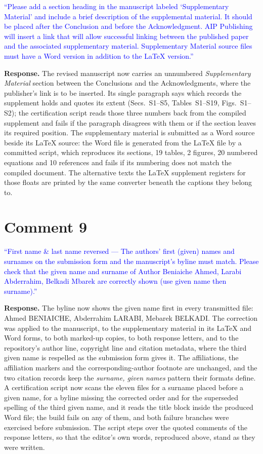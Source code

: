 \documentclass[11pt,a4paper]{article}
\begin{document}
\noindent\textcolor{blue}{``Please add a section heading in the manuscript
labeled `Supplementary Material' and include a brief description of the
supplemental material. It should be placed after the Conclusion and before the
Acknowledgment. AIP Publishing will insert a link that will allow successful
linking between the published paper and the associated supplementary material.
Supplementary Material source files must have a Word version in addition to the
\LaTeX{} version.''}

\textbf{Response.} The revised manuscript now carries an unnumbered
\textit{Supplementary Material} section between the Conclusions and the
Acknowledgments, where the publisher's link is to be inserted. Its single
paragraph says which records the supplement holds and quotes its extent
(Secs.~S1--S5, Tables~S1--S19, Figs.~S1--S2); the certification script reads those
three numbers back from the compiled supplement and fails if the paragraph
disagrees with them or if the section leaves its required position. The
supplementary material is submitted as a Word source beside its \LaTeX{} source:
the Word file is generated from the \LaTeX{} file by a committed script, which
reproduces its sections, 19 tables, 2 figures, 20 numbered equations and
10 references and fails if its numbering does not match the compiled document.
The alternative texts the \LaTeX{} supplement registers for those floats are printed
by the same converter beneath the captions they belong to.

\section*{Comment 9}

\noindent\textcolor{blue}{``First name \& last name reversed --- The authors' first
(given) names and surnames on the submission form and the manuscript's byline must
match. Please check that the given name and surname of Author Beniaiche Ahmed, Larabi
Abderrahim, Belkadi Mbarek are correctly shown (use given name then surname).''}

\textbf{Response.} The byline now shows the given name first in every transmitted
file: Ahmed BENIAICHE, Abderrahim LARABI, Mebarek BELKADI. The correction was applied
to the manuscript, to the supplementary material in its \LaTeX{} and Word forms, to
both marked-up copies, to both response letters, and to the repository's author line,
copyright line and citation metadata, where the third given name is respelled as the
submission form gives it. The affiliations, the affiliation markers and the
corresponding-author footnote are unchanged, and the two citation records keep the
\textit{surname, given names} pattern their formats define. A certification script now
scans the eleven files for a surname placed before a given name, for a byline missing
the corrected order and for the superseded spelling of the third given name, and it
reads the title block inside the produced Word file; the build fails on any of them,
and both failure branches were exercised before submission. The script steps over the
quoted comments of the response letters, so that the editor's own words, reproduced
above, stand as they were written.
\end{document}
